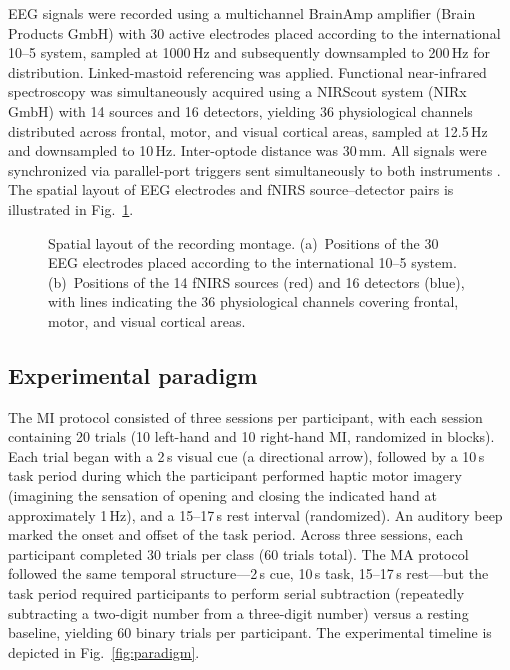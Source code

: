 \documentclass[preprint,12pt,authoryear]{elsarticle}
\begin{document}
EEG signals were recorded using a multichannel BrainAmp amplifier (Brain Products GmbH) with 30 active electrodes placed according to the international 10--5 system, sampled at 1000\,Hz and subsequently downsampled to 200\,Hz for distribution. Linked-mastoid referencing was applied. Functional near-infrared spectroscopy was simultaneously acquired using a NIRScout system (NIRx GmbH) with 14 sources and 16 detectors, yielding 36 physiological channels distributed across frontal, motor, and visual cortical areas, sampled at 12.5\,Hz and downsampled to 10\,Hz. Inter-optode distance was 30\,mm. All signals were synchronized via parallel-port triggers sent simultaneously to both instruments \citep{shin2016open_access}. The spatial layout of EEG electrodes and fNIRS source--detector pairs is illustrated in Fig.~\ref{fig:montage}.

\begin{figure}[t]
\centering
\caption{Spatial layout of the recording montage. (a)~Positions of the 30 EEG electrodes placed according to the international 10--5 system. (b)~Positions of the 14 fNIRS sources (red) and 16 detectors (blue), with lines indicating the 36 physiological channels covering frontal, motor, and visual cortical areas.}
\label{fig:montage}
\end{figure}

\subsection{Experimental paradigm}
\label{sec:paradigm}

The MI protocol consisted of three sessions per participant, with each session containing 20 trials (10 left-hand and 10 right-hand MI, randomized in blocks). Each trial began with a 2\,s visual cue (a directional arrow), followed by a 10\,s task period during which the participant performed haptic motor imagery (imagining the sensation of opening and closing the indicated hand at approximately 1\,Hz), and a 15--17\,s rest interval (randomized). An auditory beep marked the onset and offset of the task period. Across three sessions, each participant completed 30 trials per class (60 trials total). The MA protocol followed the same temporal structure---2\,s cue, 10\,s task, 15--17\,s rest---but the task period required participants to perform serial subtraction (repeatedly subtracting a two-digit number from a three-digit number) versus a resting baseline, yielding 60 binary trials per participant. The experimental timeline is depicted in Fig.~\ref{fig:paradigm}.
\end{document}
